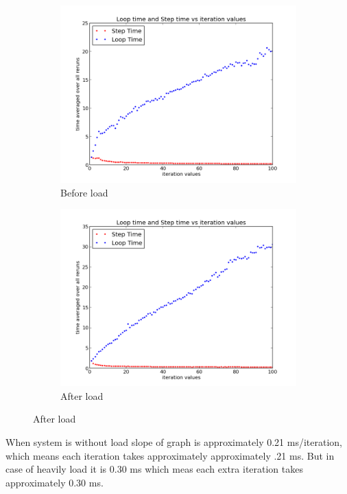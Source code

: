 \documentclass[a4paper,11pt]{article}
\begin{document}
{{\begin{figure}[h]
\centering
\begin{subfigure}{.5\textwidth}
  \centering
  \includegraphics[width=1.0\linewidth]{images/plot1}
  \caption{Before load}
\end{subfigure}%
\begin{subfigure}{.5\textwidth}
  \centering
  \includegraphics[width=1.0\linewidth]{images/plot2}
  \caption{After load}
\end{subfigure}
\end{figure}

\indent When system is without load slope of graph is approximately 0.21 ms/iteration, which means each iteration takes approximately approximately .21 ms. But in case of heavily load it is 0.30 ms which meas each extra iteration takes approximately 0.30 ms.

}}
\end{document}
